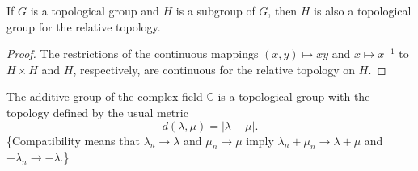 \begin{example}
    \label{ex:subgroup-topological-group}

    If \( G \) is a topological group and \( H \) is a subgroup of \( G \), then \( H \) is also a topological group for the relative topology.
\end{example}

\begin{proof}
    The restrictions of the continuous mappings \( (x, y) \mapsto xy \) and \( x \mapsto x^{-1} \) to \( H \times H \) and \( H \), respectively, are continuous for the relative topology on \( H \).
\end{proof}

\begin{example}
    \label{ex:complex-additive-topological-group}

    The additive group of the complex field \( \mathbb{C} \) is a topological group with the topology defined by the usual metric
    \[
        d(\lambda, \mu) = |\lambda - \mu|.
    \]
    \{Compatibility means that \( \lambda_n \to \lambda \) and \( \mu_n \to \mu \) imply
    \( \lambda_n + \mu_n \to \lambda + \mu \) and \( -\lambda_n \to -\lambda \).\}
\end{example}


